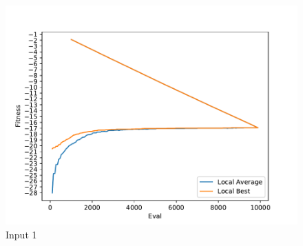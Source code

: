 \documentclass{standalone}
\begin{document}
\begin{figure}[!htb]
	\caption{Input 1}
	\label{fig:graph_1016}
	\includegraphics[width=\textwidth]{../graphs/graphs/1016.pdf}
\end{figure}
\end{document}
